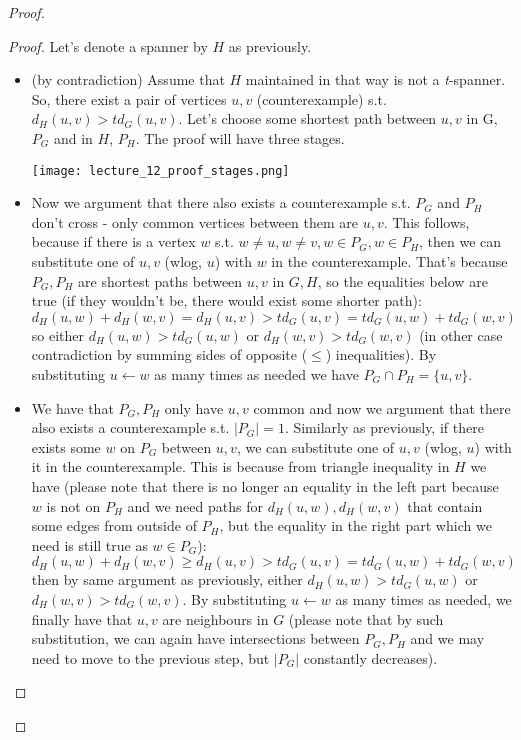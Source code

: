 \documentclass[11pt]{article}
\begin{document}
\begin{proof}
\begin{enumerate}
\begin{proof}
	 Let's denote a spanner by $H$ as previously. \\
	\begin{itemize}
		\item (by contradiction) Assume that $H$ maintained in that way is not a \textit{t}-spanner. So, there exist a pair of vertices $u,v$ (counterexample) s.t. $d_H(u,v) > t d_G(u,v)$. Let's choose some shortest path between $u,v$ in G, $P_G$ and in $H$, $P_H$. The proof will have three stages. 
		\begin{center}
			\texttt{[image: lecture\_12\_proof\_stages.png]}
		\end{center}
		\item Now we argument that there also exists a counterexample s.t. $P_G$ and $P_H$ don't cross - only common vertices between them are $u, v$. This follows, because if there is a vertex $w$ s.t. $w \neq u, w \neq v, w \in P_G, w \in P_H$, then we can substitute one of $u, v$ (wlog, $u$) with $w$ in the counterexample. That's because $P_G, P_H$ are shortest paths between $u,v$ in $G,H$, so the equalities below are true (if they wouldn't be, there would exist some shorter path):
		$$ d_H(u,w) + d_H(w,v) = d_H(u,v) > td_G(u,v) = td_G(u,w) + td_G(w,v)$$
		so either $d_H(u,w) > td_G(u,w)$ or $d_H(w,v) > td_G(w,v)$ (in other case contradiction by summing sides of opposite ($\leq$) inequalities). By substituting $u \leftarrow w$ as many times as needed we have $P_G \cap P_H = \{u,v\} $.
		\item We have that $P_G, P_H$ only have $u,v$ common and now we argument that there also exists a counterexample s.t. $|P_G|=1$. Similarly as previously, if there exists some $w$ on $P_G$ between $u,v$, we can substitute one of $u,v$ (wlog, $u$) with it in the counterexample. This is because from triangle inequality in $H$ we have (please note that there is no longer an equality in the left part because $w$ is not on $P_H$ and we need paths for $d_H(u,w), d_H(w, v)$ that contain some edges from outside of $P_H$, but the equality in the right part which we need is still true as $w \in P_G$):
		$$ d_H(u,w) + d_H(w, v) \geq d_H(u,v) > td_G(u,v) = td_G(u,w) + td_G(w,v)$$
		then by same argument as previously, either $d_H(u,w) > td_G(u,w)$ or $d_H(w,v) > td_G(w,v)$. By substituting $u \leftarrow w$ as many times as needed, we finally have that $u,v$ are neighbours in $G$ (please note that by such substitution, we can again have intersections between $P_G, P_H$ and we may need to move to the previous step, but $|P_G|$ constantly decreases).

\end{itemize}
\end{proof}
\end{enumerate}
\end{proof}
\end{document}
